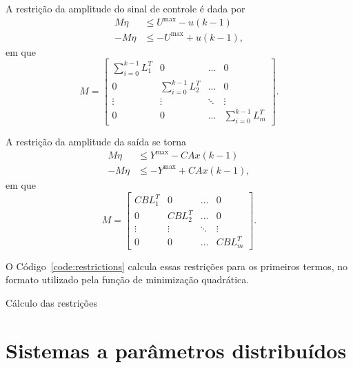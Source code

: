 A restrição da amplitude do sinal de controle é dada por
%
\begin{align}
	M\eta{}  & \le U^{\max} - u(k-1)   \\
	-M\eta{} & \le -U^{\max} + u(k-1),
\end{align}
%
em que
%
\begin{equation}
	M = \begin{bmatrix}
		\sum^{k-1}_{i=0}{L_1^T} & 0                       & \hdots{} & 0                       \\
		0                       & \sum^{k-1}_{i=0}{L_2^T} & \hdots{} & 0                       \\
		\vdots{}                & \vdots{}                & \ddots{} & \vdots{}                \\
		0                       & 0                       & \hdots{} & \sum^{k-1}_{i=0}{L_m^T}
	\end{bmatrix}.
\end{equation}

A restrição da amplitude da saída se torna
%
\begin{align}
	M\eta{}  & \le Y^{\max} - CAx(k-1)   \\
	-M\eta{} & \le -Y^{\max} + CAx(k-1),
\end{align}
%
em que
%
\begin{equation}
	M = \begin{bmatrix}
		CBL_1^T  & 0        & \hdots{} & 0        \\
		0        & CBL_2^T  & \hdots{} & 0        \\
		\vdots{} & \vdots{} & \ddots{} & \vdots{} \\
		0        & 0        & \hdots{} & CBL_m^T
	\end{bmatrix}.
\end{equation}

O Código~\ref{code:restrictions} calcula essas restrições para os primeiros
termos, no formato utilizado pela função de minimização quadrática.

\begin{code}
	\captionsetup{justification=centering}
	\caption{Cálculo das restrições}%
	\label{code:restrictions}
\end{code}
\vfill{}

\section{Sistemas a parâmetros distribuídos}%
\label{sec:spd}

